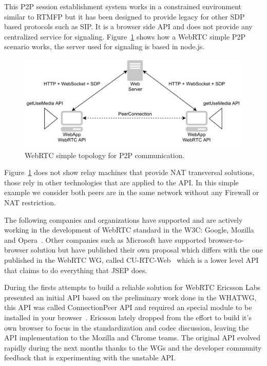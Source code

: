This P2P session establishment system works in a constrained environment similar to RTMFP but it has been designed to provide legacy for other SDP based protocols such as SIP. It is a browser side API and does not provide any centralized service for signaling. Figure~\ref{fig:webrtcExample} shows how a WebRTC simple P2P scenario works, the server used for signaling is based in node.js.

 \begin{figure}[h]
  \centering
    \includegraphics[width=1\textwidth]{./figures/webrtcExample.pdf}
      \caption[WebRTC simple topology for P2P communication]{WebRTC simple topology for P2P communication.}
	\label{fig:webrtcExample}
\end{figure}

Figure~\ref{fig:webrtcExample} does not show relay machines that provide NAT transversal solutions, those rely in other technologies that are applied to the API. In this simple example we consider both peers are in the same network without any Firewall or NAT restriction.

The following companies and organizations have supported and are actively working in the development of WebRTC standard in the W3C: Google, Mozilla and Opera~\cite{googleAnnouncement}. Other companies such as Microsoft have supported browser-to-browser solution but have published their own proposal which differs with the one published in the WebRTC WG, called CU-RTC-Web~\cite{curtcweb} which is a lower level API that claims to do everything that JSEP does.

During the firsts attempts to build a reliable solution for WebRTC Ericsson Labs presented an initial API based on the preliminary work done in the WHATWG, this API was called ConnectionPeer API and required an special module to be installed in your browser~\cite{ericssonwebrtc}. Ericsson lately dropped from the effort to build it's own browser to focus in the standardization and codec discussion, leaving the API implementation to the Mozilla and Chrome teams. The original API evolved rapidly during the next months thanks to the WGs and the developer community feedback that is experimenting with the unstable API.


